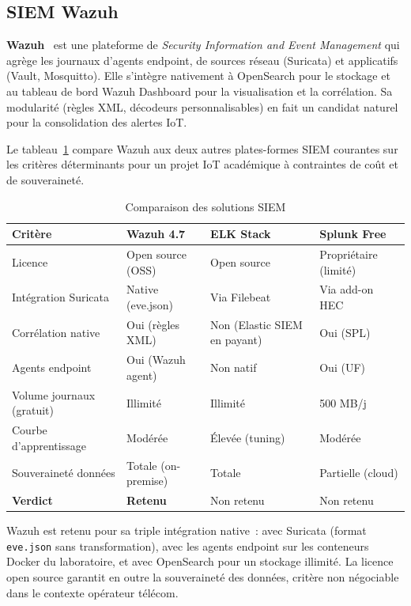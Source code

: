 \subsection{SIEM Wazuh}

\textbf{Wazuh}~\cite{wazuh_docs} est une plateforme de \emph{Security Information and Event Management} qui agrège les journaux d'agents endpoint, de sources réseau (Suricata) et applicatifs (Vault, Mosquitto). Elle s'intègre nativement à OpenSearch pour le stockage et au tableau de bord Wazuh Dashboard pour la visualisation et la corrélation. Sa modularité (règles XML, décodeurs personnalisables) en fait un candidat naturel pour la consolidation des alertes IoT.

Le tableau~\ref{tab:siem-compare} compare Wazuh aux deux autres plates-formes SIEM courantes sur les critères déterminants pour un projet IoT académique à contraintes de coût et de souveraineté.

\begin{table}[!htbp]
\centering
\caption{Comparaison des solutions SIEM}
\label{tab:siem-compare}
\small
\begin{tabularx}{\linewidth}{|l|X|X|X|}
\hline
\textbf{Critère} & \textbf{Wazuh 4.7} & \textbf{ELK Stack} & \textbf{Splunk Free} \\
\hline
Licence              & Open source (OSS)   & Open source    & Propriétaire (limité) \\ \hline
Intégration Suricata & Native (eve.json)   & Via Filebeat    & Via add-on HEC \\ \hline
Corrélation native   & Oui (règles XML)    & Non (Elastic SIEM en payant) & Oui (SPL) \\ \hline
Agents endpoint      & Oui (Wazuh agent)   & Non natif       & Oui (UF) \\ \hline
Volume journaux (gratuit) & Illimité       & Illimité        & 500 MB/j \\ \hline
Courbe d'apprentissage & Modérée          & Élevée (tuning) & Modérée \\ \hline
Souveraineté données & Totale (on-premise) & Totale          & Partielle (cloud) \\ \hline
\textbf{Verdict}     & \textbf{Retenu}     & Non retenu      & Non retenu \\ \hline
\end{tabularx}
\end{table}

Wazuh est retenu pour sa triple intégration native~: avec Suricata (format \texttt{eve.json} sans transformation), avec les agents endpoint sur les conteneurs Docker du laboratoire, et avec OpenSearch pour un stockage illimité. La licence open source garantit en outre la souveraineté des données, critère non négociable dans le contexte opérateur télécom.

